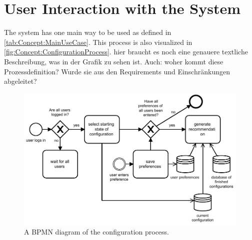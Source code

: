 \section{User Interaction with the System}
\label{sec:Concept:UserSystemInteraction}

The system has one main way to be used as defined in \autoref{tab:Concept:MainUseCase}. This process is also visualized in \autoref{fig:Concept:ConfigurationProcess}.
hier braucht es noch eine genauere textliche Beschreibung, was in der Grafik zu sehen ist. Auch: woher kommt diese Prozessdefinition? Wurde sie aus den Requirements und Einschränkungen abgeleitet?

\begin{figure}
    \centering
    \includegraphics[width=1\textwidth]{./figures/40_concept/bpmn_configuration_process_with_continious_recommendation.pdf}
    \caption{A BPMN diagram of the configuration process.}
    \label{fig:Concept:ConfigurationProcess}
\end{figure}

